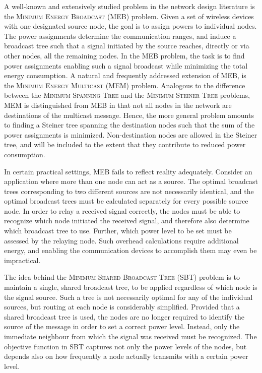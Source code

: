 A well-known and extensively studied problem in the network design literature is the \textsc{Minimum Energy Broadcast} (MEB) problem.
Given a set of wireless devices with one designated source node, the goal is to assign powers to individual nodes.
The power assignments determine the communication ranges, and induce a broadcast tree such that a signal initiated by the source reaches, directly or via other nodes,
all the remaining nodes.
In the MEB problem, the task is to find power assignments enabling such a signal broadcast while minimizing the total energy consumption.
A natural and frequently addressed extension of MEB, is the \textsc{Minimum Energy Multicast} (MEM) problem.
Analogous to the difference between the \textsc{Minimum Spanning Tree} and the \textsc{Minimum Steiner Tree} problems,
MEM is distinguished from MEB in that not all nodes in the network are destinations of the multicast message.
Hence, the more general problem amounts to finding a Steiner tree spanning the destination nodes such that the sum of the power assignments is minimized.
Non-destination nodes are allowed in the Steiner tree, and will be included to the extent that they contribute to reduced power consumption.

In certain practical settings, MEB fails to reflect reality adequately.
Consider an application where more than one node can act as a source.
The optimal broadcast trees corresponding to two different sources are not necessarily identical,
and the optimal broadcast trees must be calculated separately for every possible source node.
In order to relay a received signal correctly, the nodes must be able to recognize which node initiated the received signal, and therefore also determine which broadcast tree to use.
Further, which power level to be set must be assessed by the relaying node.
Such overhead calculations require additional energy, and enabling the communication devices to accomplish them may even be impractical.

The idea behind the \textsc{Minimum Shared Broadcast Tree} (SBT) problem is to maintain a single, shared broadcast tree, to be applied regardless of which node is the signal source.
Such a tree is not necessarily optimal for any of the individual sources, but routing at each node is considerably simplified.
Provided that a shared broadcast tree is used, the nodes are no longer required to identify the source of the message in order to set a correct power level.
Instead, only the immediate neighbour from which the signal was received must be recognized.
The objective function in SBT captures not only the power levels of the nodes, but depends also on how frequently a node actually transmits with a certain power level.

